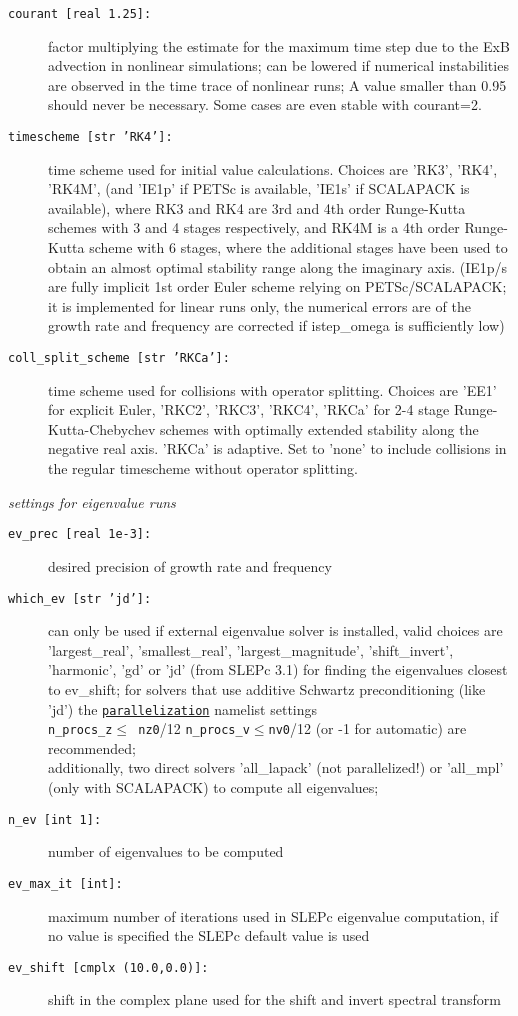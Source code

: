 \documentclass[12pt]{article}
\begin{document}
\begin{description}
\item[\texttt{courant [real 1.25]:}] factor multiplying the estimate for the maximum time step due to
  the ExB advection in nonlinear simulations; can be lowered if numerical instabilities are observed in the
  time trace of nonlinear runs; A value smaller than 0.95 should never be necessary. Some cases are even stable with courant=2.
\item[\texttt{timescheme [str 'RK4']:}] time scheme used for initial value calculations. Choices are
  'RK3', 'RK4', 'RK4M', (and 'IE1p' if PETSc is available, 'IE1s' if SCALAPACK is available),
  where RK3 and RK4 are 3rd and 4th order Runge-Kutta schemes
  with 3 and 4 stages respectively, and RK4M is a 4th order Runge-Kutta scheme with 6 stages, where the
  additional stages have  been used to obtain an almost optimal stability range along the imaginary axis.
  (IE1p/s are fully implicit 1st order Euler scheme relying on PETSc/SCALAPACK;
  it is implemented for linear runs only, the numerical
  errors are of the growth rate and frequency are corrected if istep\_omega is sufficiently low)
\item[\texttt{coll\_split\_scheme [str 'RKCa']:}] time scheme used for
  collisions with operator splitting. Choices are 'EE1' for explicit
  Euler, 'RKC2', 'RKC3', 'RKC4', 'RKCa' for 2-4 stage Runge-Kutta-Chebychev schemes with
  optimally extended stability along the negative real axis. 'RKCa' is
  adaptive. Set to 'none' to include collisions in the regular
  timescheme without operator splitting.
\end{description}
%
{\em settings for eigenvalue runs}
\begin{description}
\item[\hypertarget{ev\_prec}{\tt ev\_prec [real 1e-3]:}]
  desired precision of growth rate and frequency
\item[\texttt{which\_ev [str 'jd']:}] can only be used if external eigenvalue solver is installed, valid choices are
  'largest\_real', 'smallest\_real', 'largest\_magnitude',
  'shift\_invert', 'harmonic', 'gd' or 'jd' (from SLEPc 3.1) for finding
  the eigenvalues closest to ev\_shift; for solvers that use
  additive Schwartz preconditioning (like 'jd') the
  \hyperlink{parallelization_nml}{{\tt parallelization}} namelist
  settings \\{\tt n\_procs\_z}$\leq${\tt
  nz0}/12 {\tt n\_procs\_v}$\leq${\tt nv0}/12 (or -1 for automatic) are
  recommended;\\
  additionally, two direct solvers 'all\_lapack' (not parallelized!) or 'all\_mpl'
  (only with SCALAPACK) to compute all eigenvalues;
\item[\hypertarget{n_ev}{\texttt{n\_ev [int 1]:}}] number of eigenvalues to be computed
\item[\texttt{ev\_max\_it [int]:}] maximum number of iterations used in SLEPc eigenvalue computation,
  if no value is specified the SLEPc default value is used
\item[\texttt{ev\_shift [cmplx (10.0,0.0)]:}] shift in the complex plane used for the shift and invert spectral transform
\end{description}
\end{document}
